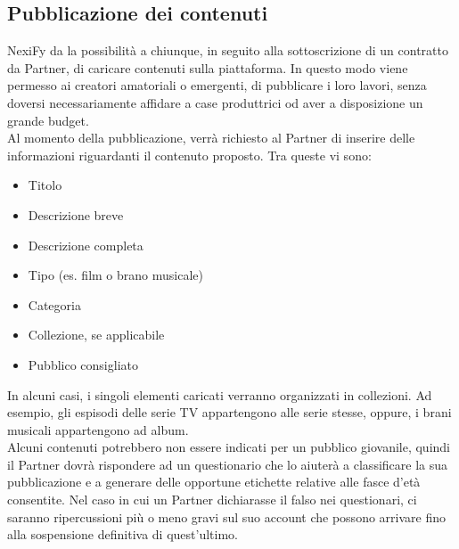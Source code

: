 \subsection{Pubblicazione dei contenuti}
NexiFy da la possibilità a chiunque, in seguito alla sottoscrizione di un contratto da Partner,
di caricare contenuti sulla piattaforma. In questo modo viene permesso ai creatori amatoriali o emergenti,
di pubblicare i loro lavori, senza doversi necessariamente affidare a case produttrici od aver a disposizione
un grande budget.\\
Al momento della pubblicazione, verrà richiesto al Partner di inserire delle informazioni riguardanti
il contenuto proposto. Tra queste vi sono:
\begin{itemize}
    \item Titolo 
    \item Descrizione breve
    \item Descrizione completa
    \item Tipo (es. film o brano musicale)
    \item Categoria
    \item Collezione, se applicabile
    \item Pubblico consigliato
\end{itemize}
In alcuni casi, i singoli elementi caricati verranno organizzati in collezioni. Ad esempio, gli espisodi delle
serie TV appartengono alle serie stesse, oppure, i brani musicali appartengono ad album.\\
Alcuni contenuti potrebbero non essere indicati per un pubblico giovanile, quindi il Partner dovrà rispondere ad
un questionario che lo aiuterà a classificare la sua pubblicazione e a generare delle opportune etichette
relative alle fasce d'età consentite. Nel caso in cui un Partner dichiarasse il falso nei questionari, ci 
saranno ripercussioni più o meno gravi sul suo account che possono arrivare fino alla sospensione definitiva
di quest'ultimo.
